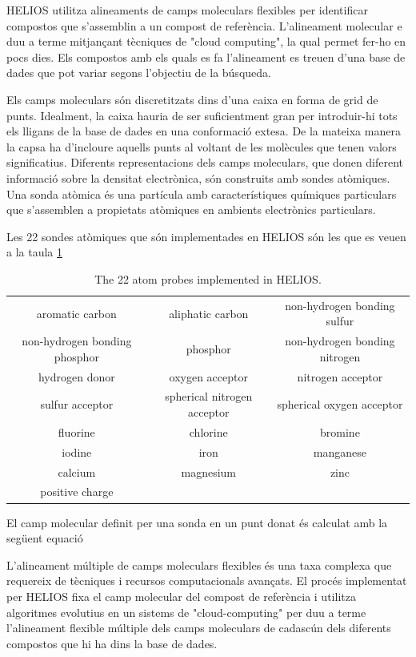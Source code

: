 \documentclass[titlepage,a4paper,12pt]{book}
\begin{document}
HELIOS utilitza alineaments de camps moleculars flexibles per identificar compostos que s'assemblin
a un compost de referència. L'alineament molecular e duu a terme mitjançant tècniques de "cloud
computing", la qual permet fer-ho en pocs dies. Els compostos amb els quals es fa l'alineament es
treuen d'una base de dades que pot variar segons l'objectiu de la búsqueda. 

Els camps moleculars són discretitzats dins d'una caixa en forma de grid de punts. Idealment, la
caixa hauria de ser suficientment gran per introduir-hi tots els lligans de la base de dades en una
conformació extesa. De la mateixa manera la capsa ha d'incloure aquells punts al voltant de les
molècules que tenen valors significatius. Diferents representacions dels camps moleculars, que donen
diferent informació sobre la densitat electrònica, són construits amb sondes atòmiques. Una sonda
atòmica és una partícula amb característiques químiques particulars que s'assemblen a propietats
atòmiques en ambients electrònics particulars. 

Les 22 sondes atòmiques que són implementades en HELIOS són les que  es veuen a la taula \ref{table:maps} 

\begin{table}
\centering
\begin{tabular}{|ccc|}
\hline
aromatic carbon &aliphatic carbon&non-hydrogen bonding sulfur\\
non-hydrogen bonding phosphor&phosphor&non-hydrogen bonding nitrogen\\
hydrogen donor&oxygen acceptor&nitrogen acceptor\\
sulfur acceptor&spherical nitrogen acceptor&spherical oxygen acceptor\\
fluorine&chlorine&bromine\\
iodine&iron&manganese\\
calcium&magnesium&zinc\\
positive charge&& \\
\hline
\end{tabular}
\caption{The 22 atom probes implemented in HELIOS.}
\label{table:maps}
\end{table}

El camp molecular definit per una sonda en un punt donat és calculat amb la
següent equació %

L'alineament múltiple de camps moleculars flexibles és una taxa complexa que requereix de tècniques i recursos computacionals avançats. El procés implementat per HELIOS fixa el camp molecular del compost de referència i utilitza algoritmes evolutius en un sistems de "cloud-computing" per duu a terme l'alineament flexible múltiple dels camps moleculars de cadascún dels diferents compostos que hi ha dins la base de dades.
\end{document}
